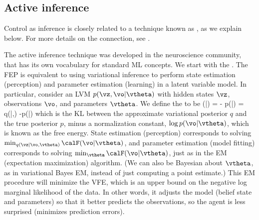 \subsection{Active inference}

Control as inference is closely related
to a technique known as ,
as we explain below. For more details on the connection, see
\citep{Millidge2020,Watson2020,VanDeLaar2021,Sajid2021,Tschantz2020}.

The active inference technique was developed in the neuroscience
community, that has its own vocabulary for standard ML concepts.
We start with 
the  
 \citep{Friston2009,Buckley2017,Schwobel2018,
  Gershman2019,Mazzaglia2022}.
The FEP is equivalent to using variational  inference
to perform state estimation (perception)
and parameter estimation (learning)
in a latent variable model.
In particular, consider an LVM $p(\vz,\vo|\vtheta)$
with hidden states $\vz$, observations $\vo$, and parameters
$\vtheta$. 
We define the  to
be
\be
\calF(\vo|\vtheta)
=  - \log p(\vo|\vtheta)
= 
{q(\vz|\vo,\vtheta)}
\geq -\log p(\vo|\vtheta)
\ee
which is the KL between the approximate variational posterior $q$
and the true posterior $p$, minus a normalization constant,
$\log p(\vo|\vtheta)$, which is known as the free energy.
State estimation (perception) corresponds to solving
$\min_{q(\vz|\vo,\vtheta)} \calF(\vo|\vtheta)$,
and parameter estimation (model fitting)
corresponds to solving $\min_{\vtheta} \calF(\vo|\vtheta)$,
just as in the  EM (expectation maximization) algorithm.
(We can also be Bayesian about $\vtheta$,
as in variational Bayes EM,
instead of just
computing a point estimate.)
This EM procedure will minimize the VFE,
which is an upper bound on the negative log marginal likelihood of the
data. In other words, it adjusts the model (belief state
and parameters) so that it better
predicts the observations, so the agent is less surprised
(minimizes prediction errors).



